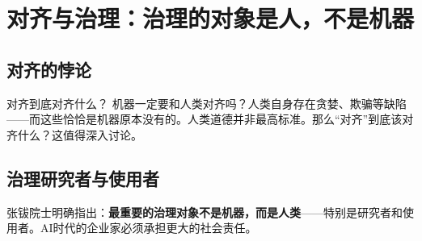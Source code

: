 \section{对齐与治理：治理的对象是人，不是机器}

\subsection{对齐的悖论}

\begin{warningbox}{对齐到底对齐什么？}
机器一定要和人类对齐吗？人类自身存在贪婪、欺骗等缺陷——而这些恰恰是机器原本没有的。人类道德并非最高标准。那么``对齐''到底该对齐什么？这值得深入讨论。
\end{warningbox}

\subsection{治理研究者与使用者}

张钹院士明确指出：\textbf{最重要的治理对象不是机器，而是人类}——特别是研究者和使用者。AI时代的企业家必须承担更大的社会责任。


